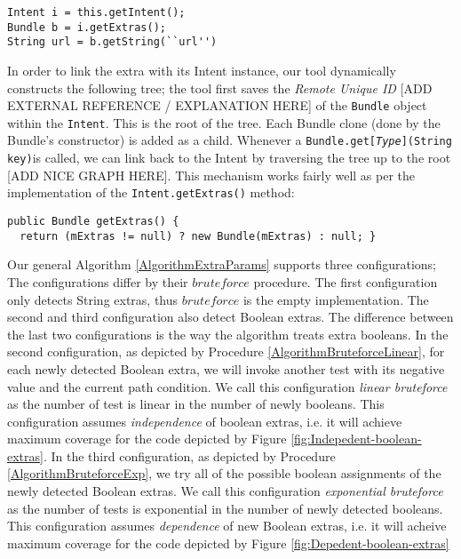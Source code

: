 \begin{lstlisting}
Intent i = this.getIntent();
Bundle b = i.getExtras();
String url = b.getString(``url'')
\end{lstlisting}
In order to link the extra with its Intent instance, our tool dynamically
constructs the following tree; the\textit{ }tool first saves the \textit{Remote
Unique ID} {[}ADD EXTERNAL REFERENCE / EXPLANATION HERE{]} of the
\texttt{Bundle} object within the \texttt{Intent}. This is the root
of the tree. Each Bundle clone (done by the Bundle's constructor)
is added as a child. Whenever a \texttt{Bundle.get{[}}\texttt{\textit{Type}}\texttt{{]}(String
key)}is called, we can link back to the Intent by traversing the tree
up to the root {[}ADD NICE GRAPH HERE{]}. This mechanism works fairly
well as per the implementation of the \texttt{Intent.getExtras()}
method:
\begin{lstlisting}
public Bundle getExtras() {
  return (mExtras != null) ? new Bundle(mExtras) : null; }
\end{lstlisting}
Our general Algorithm \ref{AlgorithmExtraParams} supports three configurations;
The configurations differ by their $bruteforce$ procedure. The first
configuration only detects String extras, thus $bruteforce$ is the
empty implementation. The second and third configuration also detect
Boolean extras. The difference between the last two configurations
is the way the algorithm treats extra booleans. In the second configuration,
as depicted by Procedure \ref{AlgorithmBruteforceLinear}, for each
newly detected Boolean extra, we will invoke another test with its
negative value and the current path condition. We call this configuration
\textit{linear bruteforce} as the number of test is linear in the
number of newly booleans. This configuration assumes \textit{independence}
of boolean extras, i.e. it will achieve maximum coverage for the code
depicted by Figure \ref{fig:Indepedent-boolean-extras}. In the third
configuration, as depicted by Procedure \ref{AlgorithmBruteforceExp},
we try all of the possible boolean assignments of the newly detected
Boolean extras. We call this configuration \textit{exponential bruteforce}
as the number of tests is exponential in the number of newly detected
booleans. This configuration assumes \textit{dependence} of new Boolean
extras, i.e. it will acheive maximum coverage for the code depicted
by Figure \ref{fig:Depedent-boolean-extras}

